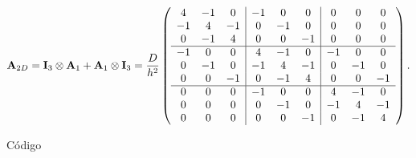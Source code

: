 \[
\mathbf{A}_{2D} = \mathbf{I}_3\otimes\mathbf{A}_1 + \mathbf{A}_1\otimes\mathbf{I}_3 = \frac{D}{h^2}\left(
\begin{array}{ccc|ccc|ccc}
	4 & -1 &  0 & -1 &  0 &  0 &  0 &  0 &  0\\
	-1 &  4 & -1 &  0 & -1 &  0 &  0 &  0 &  0\\
	0 & -1 &  4 &  0 &  0 & -1 &  0 &  0 &  0\\ \hline
	-1 &  0 &  0 &  4 & -1 &  0 & -1 &  0 &  0\\
	0 & -1 &  0 & -1 &  4 & -1 &  0 & -1 &  0\\
	0 &  0 & -1 &  0 & -1 &  4 &  0 &  0 & -1\\ \hline
	0 &  0 &  0 & -1 &  0 &  0 &  4 & -1 &  0\\
	0 &  0 &  0 &  0 & -1 &  0 & -1 &  4 & -1\\
	0 &  0 &  0 &  0 &  0 & -1 &  0 & -1 &  4
\end{array}\right).
\]



Código


